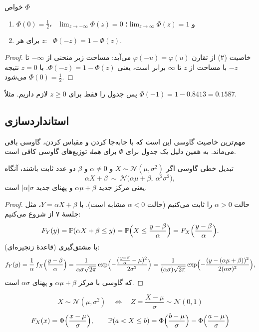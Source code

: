 \begin{proposition}[label=prop:phi]{خواص $\Phi$}
\begin{enumerate}
  \item $\Phi(0)=\tfrac12$، \ $\lim_{z\to-\infty}\Phi(z)=0$ و $\lim_{z\to\infty}\Phi(z)=1$؛
  \item برای هر $z$: \ $\Phi(-z)=1-\Phi(z)$.
\end{enumerate}
\end{proposition}

\begin{proof}
خاصیت (۲) از تقارن $\varphi(-u)=\varphi(u)$ می‌آید: مساحت زیر منحنی از $-\infty$ تا $-z$ با مساحت از $z$ تا $\infty$ برابر است، یعنی $\Phi(-z)=1-\Phi(z)$. با $z=0$ نتیجه می‌شود $\Phi(0)=\tfrac12$.
\end{proof}

پس جدول را فقط برای $z\ge0$ لازم داریم. مثلاً $\Phi(-1)=1-0.8413=0.1587$.

\subsection{استانداردسازی}

مهم‌ترین خاصیت گاوسی این است که با جابه‌جا کردن و مقیاس کردن، گاوسی باقی می‌ماند. به همین دلیل یک جدول برای $\Phi$ برای \emph{همهٔ} توزیع‌های گاوسی کافی است.

\begin{theorem}[label=thm:gauss-linear]{تبدیل خطی گاوسی}
اگر $X\sim\mathcal N(\mu,\sigma^2)$ و $\alpha\ne0$ و $\beta$ دو عدد ثابت باشند، آنگاه
\[ \alpha X+\beta\ \sim\ \mathcal N\bigl(\alpha\mu+\beta,\ \alpha^2\sigma^2\bigr), \]
یعنی مرکز جدید $\alpha\mu+\beta$ و پهنای جدید $|\alpha|\sigma$ است.
\end{theorem}

\begin{proof}
حالت $\alpha>0$ را ثابت می‌کنیم (حالت $\alpha<0$ مشابه است). با $Y=\alpha X+\beta$، مثل جلسهٔ ۷ از  شروع می‌کنیم:
\[ F_Y(y)=\P(\alpha X+\beta\le y)=\P\Bigl(X\le\frac{y-\beta}{\alpha}\Bigr)=F_X\Bigl(\frac{y-\beta}{\alpha}\Bigr). \]
با مشتق‌گیری (قاعدهٔ زنجیره‌ای):
\[ f_Y(y)=\frac1\alpha\,f_X\Bigl(\frac{y-\beta}{\alpha}\Bigr)=\frac{1}{\alpha\sigma\sqrt{2\pi}}\exp\Bigl(-\frac{(\frac{y-\beta}{\alpha}-\mu)^2}{2\sigma^2}\Bigr)=\frac{1}{(\alpha\sigma)\sqrt{2\pi}}\exp\Bigl(-\frac{(y-(\alpha\mu+\beta))^2}{2(\alpha\sigma)^2}\Bigr), \]
که  گاوسی با مرکز $\alpha\mu+\beta$ و پهنای $\alpha\sigma$ است.
\end{proof}

\begin{keyformula}
\[ X\sim\mathcal N(\mu,\sigma^2)\quad\Longleftrightarrow\quad Z=\frac{X-\mu}{\sigma}\sim\mathcal N(0,1) \]
\[ F_X(x)=\Phi\Bigl(\frac{x-\mu}{\sigma}\Bigr),\qquad \P(a<X\le b)=\Phi\Bigl(\frac{b-\mu}{\sigma}\Bigr)-\Phi\Bigl(\frac{a-\mu}{\sigma}\Bigr) \]
\end{keyformula}

